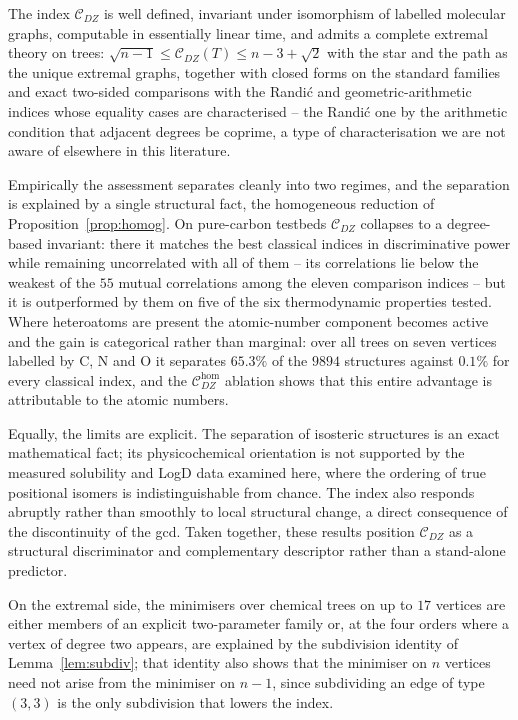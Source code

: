 \documentclass[11pt,a4paper]{article}
\theoremstyle{plain}
\theoremstyle{definition}
\theoremstyle{remark}
\newcommand{\CDZ}{\mathcal{C}_{DZ}}
\newcommand{\CDZhom}{\mathcal{C}_{DZ}^{\mathrm{hom}}}
\begin{document}
The index $\CDZ$ is well defined, invariant under isomorphism of labelled
molecular graphs, computable in essentially linear time, and admits a complete
extremal theory on trees: $\sqrt{n-1}\le\CDZ(T)\le n-3+\sqrt2$ with the star and
the path as the unique extremal graphs, together with closed forms on the
standard families and exact two-sided comparisons with the Randi\'c and
geometric-arithmetic indices whose equality cases are characterised -- the
Randi\'c one by the arithmetic condition that adjacent degrees be coprime, a type
of characterisation we are not aware of elsewhere in this literature.

Empirically the assessment separates cleanly into two regimes, and the separation
is explained by a single structural fact, the homogeneous reduction of
Proposition~\ref{prop:homog}. On pure-carbon testbeds $\CDZ$ collapses to a
degree-based invariant: there it matches the best classical indices in
discriminative power while remaining uncorrelated with all of them -- its
correlations lie below the weakest of the $55$ mutual correlations among the
eleven comparison indices -- but it is outperformed by them on five of the six
thermodynamic properties tested. Where heteroatoms are present the atomic-number
component becomes active and the gain is categorical rather than marginal: over
all trees on seven vertices labelled by C, N and O it separates $65.3\%$ of the
$9894$ structures against $0.1\%$ for every classical index, and the $\CDZhom$
ablation shows that this entire advantage is attributable to the atomic numbers.

Equally, the limits are explicit. The separation of isosteric structures is an
exact mathematical fact; its physicochemical orientation is not supported by the
measured solubility and LogD data examined here, where the ordering of true
positional isomers is indistinguishable from chance. The index also responds
abruptly rather than smoothly to local structural change, a direct consequence of
the discontinuity of the gcd. Taken together, these results position $\CDZ$ as a
structural discriminator and complementary descriptor rather than a stand-alone
predictor.

On the extremal side, the minimisers over chemical trees on up to $17$ vertices
are either members of an explicit two-parameter family or, at the four orders
where a vertex of degree two appears, are explained by the subdivision identity
of Lemma~\ref{lem:subdiv}; that identity also shows that the minimiser on $n$
vertices need not arise from the minimiser on $n-1$, since subdividing an edge
of type $(3,3)$ is the only subdivision that lowers the index.
\end{document}
